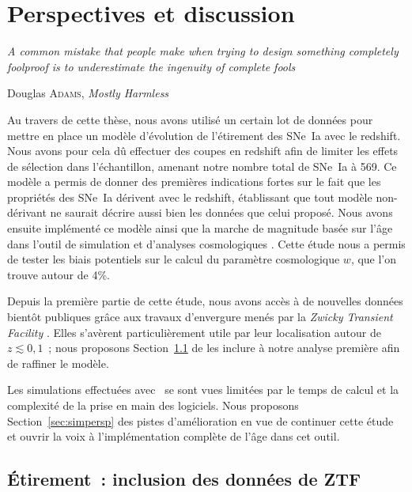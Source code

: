 \documentclass[../main/main.tex]{subfiles}
\begin{document}

\chapter{Perspectives et discussion}\label{ch:persp}
\epigraph{\openquote\textit{A common mistake that people make when trying to
design something completely foolproof is to underestimate the ingenuity of
complete fools}\closequote}{Douglas \textsc{Adams}, \textit{Mostly Harmless}}

Au travers de cette thèse, nous avons utilisé un certain lot de données pour
mettre en place un modèle d'évolution de l'étirement des SNe~Ia avec le
redshift. Nous avons pour cela dû effectuer des coupes en redshift afin de
limiter les effets de sélection dans l'échantillon, amenant notre nombre total
de SNe~Ia à 569. Ce modèle a permis de donner des premières indications fortes
sur le fait que les propriétés des SNe~Ia dérivent avec le redshift, établissant
que tout modèle non-dérivant ne saurait décrire aussi bien les données que celui
proposé. Nous avons ensuite implémenté ce modèle ainsi que la marche de
magnitude basée sur l'âge dans l'outil de simulation et d'analyses cosmologiques
\snana. Cette étude nous a permis de tester les biais potentiels sur le calcul
du paramètre cosmologique $w$, que l'on trouve autour de 4\%.

Depuis la première partie de cette étude, nous avons accès à de nouvelles
données bientôt publiques grâce aux travaux d'envergure menés par la
\textit{Zwicky Transient Facility} \citep[ZTF,][]{bellm2019}. Elles s'avèrent
particulièrement utile par leur localisation autour de $z \lesssim 0,1$~; nous
proposons Section~\ref{sec:xztf} de les inclure à notre analyse première afin de
raffiner le modèle.

Les simulations effectuées avec \snana\ se sont vues limitées par le temps de
calcul et la complexité de la prise en main des logiciels. Nous proposons
Section~\ref{sec:simpersp} des pistes d'amélioration en vue de continuer cette
étude et ouvrir la voix à l'implémentation complète de l'âge dans cet outil.

\vfill
\minitoc
\vfill

\newpage

\section{Étirement~: inclusion des données de ZTF}\label{sec:xztf}
\end{document}

